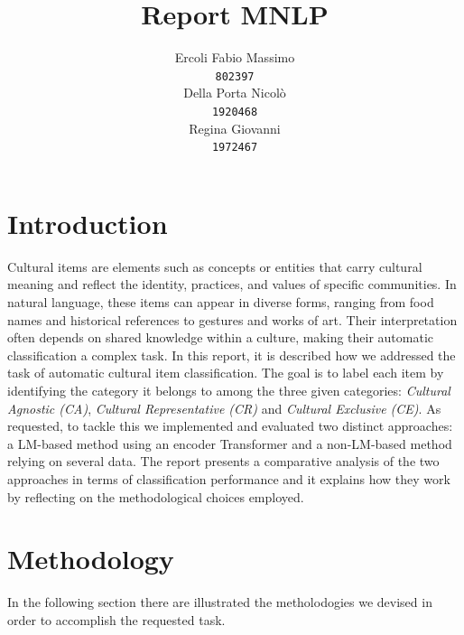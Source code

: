 \documentclass[11pt]{article}
\title{Report MNLP}
\author{Ercoli Fabio Massimo \\
\texttt{802397} \\\And
Della Porta Nicolò \\
\texttt{1920468} \\\And
Regina Giovanni \\
\texttt{1972467} \\}
\begin{document}
\maketitle

\section{Introduction}
Cultural items are elements such as concepts or entities that carry cultural meaning and reflect the identity, practices, and values of specific communities. In natural language, these items can appear in diverse forms, ranging from food names and historical references to gestures and works of art. Their interpretation often depends on shared knowledge within a culture, making their automatic classification a complex task. \newline In this report, it is described how we addressed the task of automatic cultural item classification. The goal is to label each item by identifying the category it belongs to among the three given categories: \textit{Cultural Agnostic (CA)}, \textit{Cultural Representative (CR)} and \textit{Cultural Exclusive (CE)}. As requested, to tackle this we implemented and evaluated two distinct approaches: a LM-based method using an encoder Transformer and a non-LM-based method relying on several data. The report presents a comparative analysis of the two approaches in terms of classification performance and it explains how they work by reflecting on the methodological choices employed.

\section{Methodology}
In the following section there are illustrated the metholodogies we devised in order to accomplish the requested task.
\end{document}
